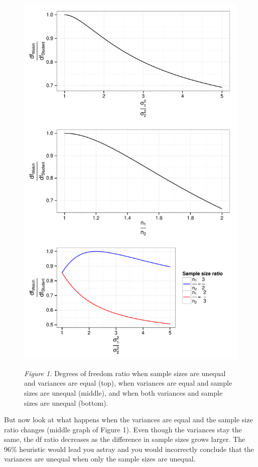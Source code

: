 \documentclass[man,a4paper,noextraspace,apacite]{apa6}
\begin{document}
\begin{figure}
\includegraphics{WelchManuscript-MASTER-dfratiosDiffvars}

\textit{Figure 1.} Degrees of freedom ratio when sample sizes are unequal and 
variances are equal (top), when variances are equal and sample sizes are 
unequal (middle), and when both variances and sample sizes are unequal (bottom).
\end{figure}

    But now look at what happens when the variances are equal and the sample 
size ratio changes (middle graph of Figure 1). Even though the variances stay 
the same, the df ratio decreases as the difference in sample sizes grows 
larger. The 96\% heuristic would lead you astray and you would incorrectly 
conclude that the variances are unequal when only the sample sizes are unequal.
\end{document}
